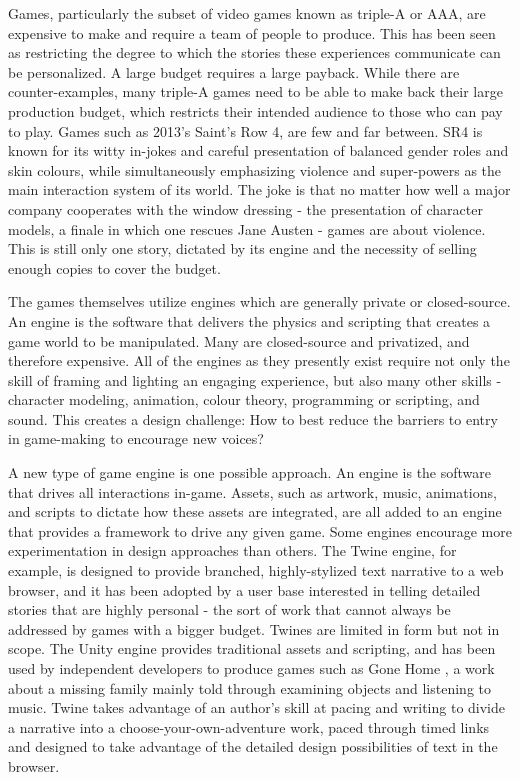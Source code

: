 Games, particularly the subset of video games known as triple-A or AAA, are expensive to make and require a team of people to produce. This has been seen as restricting the degree to which the stories these experiences communicate can be personalized. A large budget requires a large payback. While there are counter-examples, many triple-A games need to be able to make back their large production budget, which restricts their intended audience to those who can pay to play. Games such as 2013's Saint's Row 4, \parencite{saintsrow} are few and far between. SR4 is known for its witty in-jokes and careful presentation of balanced gender roles and skin colours, while simultaneously emphasizing violence and super-powers as the main interaction system of its world. The joke is that no matter how well a major company cooperates with the window dressing - the presentation of character models, a finale in which one rescues Jane Austen - games are about violence. This is still only one story, dictated by its engine and the necessity of selling enough copies to cover the budget.

The games themselves utilize engines which are generally private or closed-source. An engine is the software that delivers the physics and scripting that creates a game world to be manipulated. Many are closed-source and privatized, and therefore expensive. All of the engines as they presently exist require not only the skill of framing and lighting an engaging experience, but also many other skills - character modeling, animation, colour theory, programming or scripting, and sound. This creates a design challenge: How to best reduce the barriers to entry in game-making to encourage new voices?

A new type of game engine is one possible approach. An engine is the software that drives all interactions in-game. Assets, such as artwork, music, animations, and scripts to dictate how these assets are integrated, are all added to an engine that provides a framework to drive any given game. Some engines encourage more experimentation in design approaches than others. The Twine engine, for example, is designed to provide branched, highly-stylized text narrative to a web browser, and it has been adopted by a user base interested in telling detailed stories that are highly personal - the sort of work that cannot always be addressed by games with a bigger budget. Twines are limited in form but not in scope. The Unity engine provides traditional assets and scripting, and has been used by independent developers to produce games such as Gone Home \parencite{fullbrightco}, a work about a missing family mainly told through examining objects and listening to music. Twine takes advantage of an author's skill at pacing and writing to divide a narrative into a choose-your-own-adventure work, paced through timed links and designed to take advantage of the detailed design possibilities of text in the browser.

